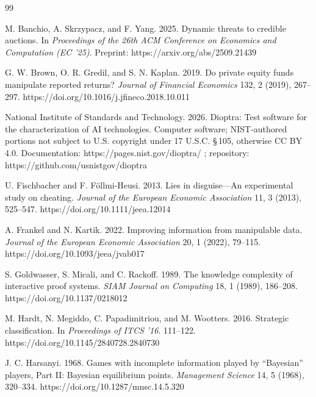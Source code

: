 \clearpage
\begin{thebibliography}{99}

M. Banchio, A. Skrzypacz, and F. Yang. 2025.
Dynamic threats to credible auctions.
In \emph{Proceedings of the 26th ACM Conference on Economics and Computation (EC '25)}.
Preprint: https://arxiv.org/abs/2509.21439

G. W. Brown, O. R. Gredil, and S. N. Kaplan. 2019.
Do private equity funds manipulate reported returns?
\emph{Journal of Financial Economics} 132, 2 (2019), 267--297.
https://doi.org/10.1016/j.jfineco.2018.10.011

National Institute of Standards and Technology. 2026.
Dioptra: Test software for the characterization of AI technologies.
Computer software; NIST-authored portions not subject to U.S. copyright under
17 U.S.C. \S\,105, otherwise CC BY 4.0.
Documentation: https://pages.nist.gov/dioptra/ ;
repository: https://github.com/usnistgov/dioptra

U. Fischbacher and F. Föllmi-Heusi. 2013.
Lies in disguise---An experimental study on cheating.
\emph{Journal of the European Economic Association} 11, 3 (2013), 525--547.
https://doi.org/10.1111/jeea.12014

A. Frankel and N. Kartik. 2022.
Improving information from manipulable data.
\emph{Journal of the European Economic Association} 20, 1 (2022), 79--115.
https://doi.org/10.1093/jeea/jvab017

S. Goldwasser, S. Micali, and C. Rackoff. 1989.
The knowledge complexity of interactive proof systems.
\emph{SIAM Journal on Computing} 18, 1 (1989), 186--208.
https://doi.org/10.1137/0218012

M. Hardt, N. Megiddo, C. Papadimitriou, and M. Wootters. 2016.
Strategic classification.
In \emph{Proceedings of ITCS '16}. 111--122.
https://doi.org/10.1145/2840728.2840730

J. C. Harsanyi. 1968.
Games with incomplete information played by ``Bayesian'' players, Part II:
Bayesian equilibrium points.
\emph{Management Science} 14, 5 (1968), 320--334.
https://doi.org/10.1287/mnsc.14.5.320


\end{thebibliography}

